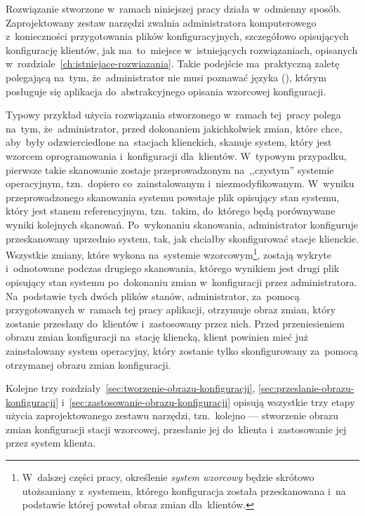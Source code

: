 \documentclass[thesis]{subfiles}
\begin{document}
Rozwiązanie stworzone w~ramach niniejszej pracy działa w~odmienny sposób. Zaprojektowany zestaw narzędzi zwalnia administratora komputerowego z~konieczności przygotowania plików konfiguracyjnych, szczegółowo opisujących konfigurację klientów, jak ma~to~miejsce w~istniejących rozwiązaniach, opisanych w~rozdziale~\ref{ch:istniejace-rozwiazania}. Takie podejście ma~praktyczną zaletę polegającą na~tym, że~administrator nie musi poznawać języka (), którym posługuje się aplikacja do~abstrakcyjnego opisania wzorcowej konfiguracji.

Typowy przykład użycia rozwiązania stworzonego w~ramach tej~pracy polega na~tym, że~administrator, przed dokonaniem jakichkolwiek zmian, które chce, aby~były odzwierciedlone na~stacjach klienckich, skanuje system, który jest wzorcem oprogramowania i~konfiguracji dla~klientów. W~typowym przypadku, pierwsze takie skanowanie zostaje przeprowadzonym na~,,czystym'' systemie operacyjnym, tzn.~dopiero co~zainstalowanym i~niezmodyfikowanym. W~wyniku przeprowadzonego skanowania systemu powstaje plik opisujący stan systemu, który jest stanem referencyjnym, tzn.~takim, do~którego będą porównywane wyniki kolejnych skanowań. Po~wykonaniu skanowania, administrator konfiguruje przeskanowany uprzednio system, tak, jak chciałby skonfigurować stacje klienckie. Wszystkie zmiany, które wykona na~systemie wzorcowym\footnote{W~dalszej części pracy, określenie \emph{system wzorcowy} będzie skrótowo utożsamiany z~systemem, którego konfiguracja została przeskanowana i~na podstawie której powstał obraz zmian dla~klientów.}, zostają wykryte i~odnotowane podczas drugiego skanowania, którego wynikiem jest drugi plik opisujący stan systemu po~dokonaniu zmian w~konfiguracji przez administratora. Na~podstawie tych dwóch plików stanów, administrator, za~pomocą przygotowanych w~ramach tej pracy aplikacji, otrzymuje obraz zmian, który zostanie przesłany do~klientów i~zastosowany przez nich. Przed przeniesieniem obrazu zmian konfiguracji na~stację kliencką, klient powinien mieć już zainstalowany system operacyjny, który zostanie tylko skonfigurowany za~pomocą otrzymanej obrazu zmian konfiguracji.

Kolejne trzy rozdziały~\ref{sec:tworzenie-obrazu-konfiguracji}, \ref{sec:przeslanie-obrazu-konfiguracji} i~\ref{sec:zastosowanie-obrazu-konfiguracji} opisują wszystkie trzy etapy użycia zaprojektowanego zestawu narzędzi, tzn.~kolejno --- stworzenie obrazu zmian konfiguracji stacji wzorcowej, przesłanie jej do~klienta i~zastosowanie jej przez system klienta.
\end{document}
